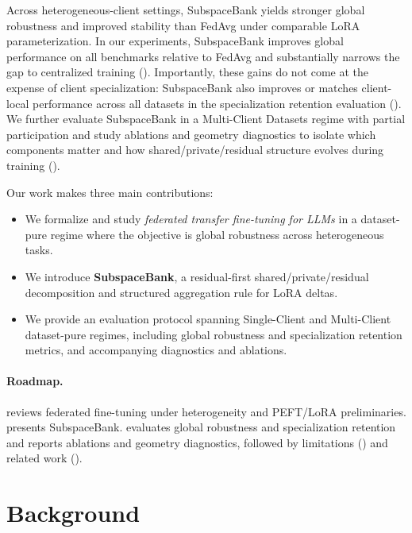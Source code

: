 \documentclass{article}
\theoremstyle{plain}
\theoremstyle{definition}
\theoremstyle{remark}
\begin{document}
Across heterogeneous-client settings, SubspaceBank yields stronger global robustness and improved stability than FedAvg under comparable LoRA parameterization. In our experiments, SubspaceBank improves global performance on all benchmarks relative to FedAvg and substantially narrows the gap to centralized training (). Importantly, these gains do not come at the expense of client specialization: SubspaceBank also improves or matches client-local performance across all datasets in the specialization retention evaluation (). We further evaluate SubspaceBank in a Multi-Client Datasets regime with partial participation and study ablations and geometry diagnostics to isolate which components matter and how shared/private/residual structure evolves during training ().

Our work makes three main contributions: 
\begin{itemize}
    \item We formalize and study \emph{federated transfer fine-tuning for LLMs} in a dataset-pure regime where the objective is global robustness across heterogeneous tasks.
    \item We introduce \textbf{SubspaceBank}, a residual-first shared/private/residual decomposition and structured aggregation rule for LoRA deltas.
    \item We provide an evaluation protocol spanning Single-Client and Multi-Client dataset-pure regimes, including global robustness and specialization retention metrics, and accompanying diagnostics and ablations.
\end{itemize}

\paragraph{Roadmap.}
 reviews federated fine-tuning under heterogeneity and PEFT/LoRA preliminaries.  presents SubspaceBank.  evaluates global robustness and specialization retention and reports ablations and geometry diagnostics, followed by limitations () and related work ().


\section{Background}
\label{sec:background}
\end{document}
